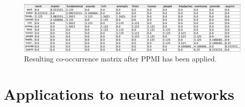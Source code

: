 \begin{figure}[h]
    \centering
    \includegraphics[scale=.45]{./images/weighted_cooc_matrix.png}
    \caption[Generated using SimBrain.]{Resulting co-occurrence matrix after PPMI has been applied.}
 \label{ppmiExample}
\end{figure}


\section{Applications to neural networks}





